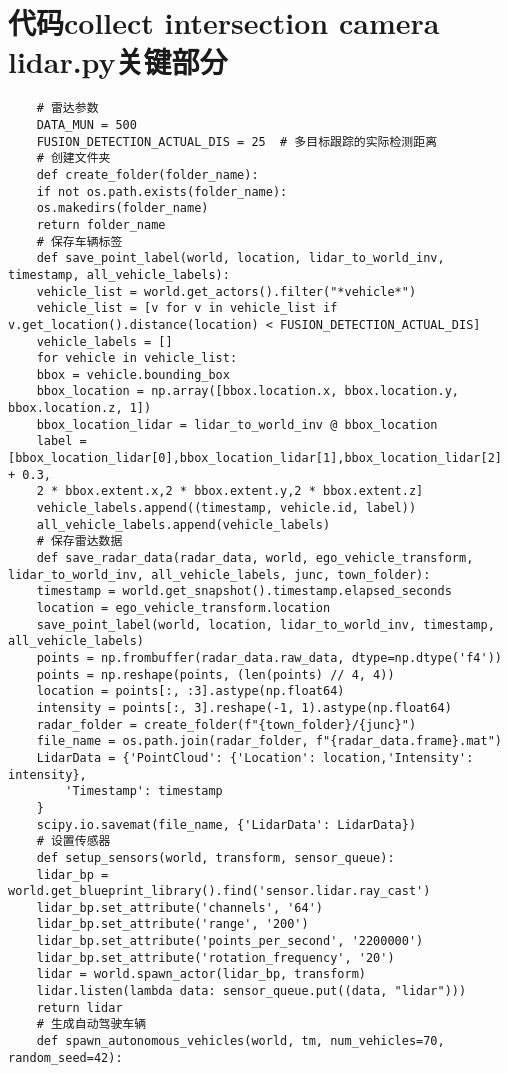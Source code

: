 \section{代码collect intersection camera lidar.py关键部分}

\begin{lstlisting}
	# 雷达参数
	DATA_MUN = 500
	FUSION_DETECTION_ACTUAL_DIS = 25  # 多目标跟踪的实际检测距离
	# 创建文件夹
	def create_folder(folder_name):
	if not os.path.exists(folder_name):
	os.makedirs(folder_name)
	return folder_name
	# 保存车辆标签
	def save_point_label(world, location, lidar_to_world_inv, timestamp, all_vehicle_labels):
	vehicle_list = world.get_actors().filter("*vehicle*")
	vehicle_list = [v for v in vehicle_list if v.get_location().distance(location) < FUSION_DETECTION_ACTUAL_DIS]
	vehicle_labels = []
	for vehicle in vehicle_list:
	bbox = vehicle.bounding_box
	bbox_location = np.array([bbox.location.x, bbox.location.y, bbox.location.z, 1])
	bbox_location_lidar = lidar_to_world_inv @ bbox_location
	label = [bbox_location_lidar[0],bbox_location_lidar[1],bbox_location_lidar[2] + 0.3,
	2 * bbox.extent.x,2 * bbox.extent.y,2 * bbox.extent.z]
	vehicle_labels.append((timestamp, vehicle.id, label))
	all_vehicle_labels.append(vehicle_labels)
	# 保存雷达数据
	def save_radar_data(radar_data, world, ego_vehicle_transform, lidar_to_world_inv, all_vehicle_labels, junc, town_folder):
	timestamp = world.get_snapshot().timestamp.elapsed_seconds
	location = ego_vehicle_transform.location
	save_point_label(world, location, lidar_to_world_inv, timestamp, all_vehicle_labels)
	points = np.frombuffer(radar_data.raw_data, dtype=np.dtype('f4'))
	points = np.reshape(points, (len(points) // 4, 4))
	location = points[:, :3].astype(np.float64)
	intensity = points[:, 3].reshape(-1, 1).astype(np.float64)
	radar_folder = create_folder(f"{town_folder}/{junc}")
	file_name = os.path.join(radar_folder, f"{radar_data.frame}.mat")
	LidarData = {'PointCloud': {'Location': location,'Intensity': intensity},
		'Timestamp': timestamp
	}
	scipy.io.savemat(file_name, {'LidarData': LidarData})
	# 设置传感器
	def setup_sensors(world, transform, sensor_queue):
	lidar_bp = world.get_blueprint_library().find('sensor.lidar.ray_cast')
	lidar_bp.set_attribute('channels', '64')
	lidar_bp.set_attribute('range', '200')
	lidar_bp.set_attribute('points_per_second', '2200000')
	lidar_bp.set_attribute('rotation_frequency', '20')
	lidar = world.spawn_actor(lidar_bp, transform)
	lidar.listen(lambda data: sensor_queue.put((data, "lidar")))
	return lidar
	# 生成自动驾驶车辆
	def spawn_autonomous_vehicles(world, tm, num_vehicles=70, random_seed=42):

\end{lstlisting}
